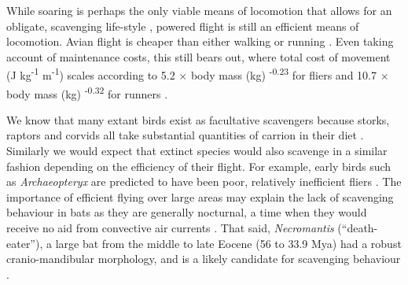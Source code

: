 \documentclass[a4paper,12pt]{article}
\begin{document}
While soaring is perhaps the only viable means of locomotion that allows for an obligate, scavenging life-style \citep{ruxton2004obligate}, powered flight is still an efficient means of locomotion. 
Avian flight is cheaper than either walking or running \citep{tucker1975energetic}. 
Even taking account of maintenance costs, this still bears out, where total cost of movement (J kg\textsuperscript{-1} m\textsuperscript{-1}) scales according to 5.2 $\times$ body mass (kg) \textsuperscript{-0.23} for fliers and 10.7 $\times$ body mass (kg) \textsuperscript{-0.32} for runners \citep{williams1999evolution}.  

We know that many extant birds exist as facultative scavengers because storks, raptors and corvids all take substantial quantities of carrion in their diet \citep{kendall2013alternative}. 
Similarly we would expect that extinct species would also scavenge in a similar fashion depending on the efficiency of their flight. 
For example, early birds such as \textit{Archaeopteryx} are predicted to have been poor, relatively inefficient fliers \citep{nudds2010narrow}. 
The importance of efficient flying over large areas may explain the lack of scavenging behaviour in bats as they are generally nocturnal, a time when they would receive no aid from convective air currents \citep{norberg2012vertebrate}. 
That said, \textit{Necromantis} (``death-eater''), a large bat from the middle to late Eocene (56 to 33.9 Mya) had a robust cranio-mandibular morphology, and is a likely candidate for scavenging behaviour \citep{Weithofer_Necromantis_1887,Hand_Necromantis_2012}.%
\end{document}
